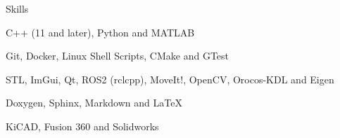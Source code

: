 \begin{section}{Skills}

  \begin{skills}

    \item {}
      {C++ (11 and later), Python and MATLAB}

    \item {}
      {Git, Docker, Linux Shell Scripts, CMake and GTest}

    \item {}
      {STL, ImGui, Qt, ROS2 (rclcpp), MoveIt!, OpenCV, Orocos-KDL and Eigen}

    \item {}
      {Doxygen, Sphinx, Markdown and LaTeX}

    \item {}
      {KiCAD, Fusion 360 and Solidworks}




  \end{skills}

  \end{section}
